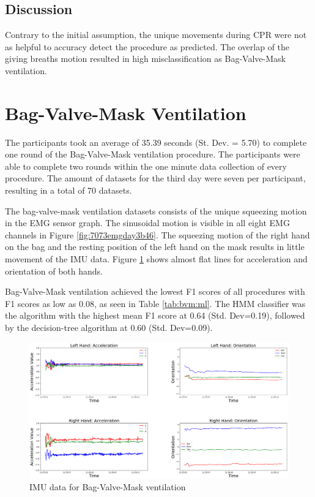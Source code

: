 \subsection{Discussion}
\label{sec:Results:CPR:Discussion}
Contrary to the initial assumption, the unique movements during CPR were not as helpful to accuracy detect the procedure as predicted. The overlap of the giving breaths motion resulted in high misclassification as Bag-Valve-Mask ventilation.
\section{Bag-Valve-Mask Ventilation}
\label{sec:Results:BVM}
The participants took an average of 35.39 seconds (St. Dev. = 5.70) to complete one round of the Bag-Valve-Mask ventilation procedure. The participants were able to complete two rounds within the one minute data collection of every procedure. The amount of datasets for the third day were seven per participant, resulting in a total of 70 datasets.
\par The bag-valve-mask ventilation datasets consists of the unique squeezing motion in the EMG sensor graph. The sinusoidal motion is visible in all eight EMG channels in Figure \ref{fig:7073emgday3b46}. The squeezing motion of the right hand on the bag and the resting position of the left hand on the mask results in little movement of the IMU data. Figure \ref{fig:7073imuday3b46} shows almost flat lines for acceleration and orientation of both hands.
\par Bag-Valve-Mask ventilation achieved the lowest F1 scores of all procedures with F1 scores as low as 0.08, as seen in Table \ref{tab:bvm:ml}. The HMM classifier was the algorithm with the highest mean F1 score at 0.64 (Std. Dev=0.19), followed by the decision-tree algorithm at 0.60 (Std. Dev=0.09).
\begin{figure}
	\centering
	\includegraphics[width=0.8\linewidth]{pictures/7073_IMU_Day3_b_46}
	\caption{IMU data for Bag-Valve-Mask ventilation}
	\label{fig:7073imuday3b46}
\end{figure}
